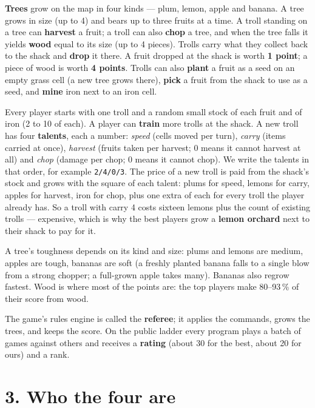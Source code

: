 \documentclass[10pt,a4paper]{article}
\begin{document}
\textbf{Trees} grow on the map in four kinds --- plum, lemon, apple and banana. A tree grows in size (up to 4) and bears up to three fruits at a time. A troll standing on a tree can \textbf{harvest} a fruit; a troll can also \textbf{chop} a tree, and when the tree falls it yields \textbf{wood} equal to its size (up to 4 pieces). Trolls carry what they collect back to the shack and \textbf{drop} it there. A fruit dropped at the shack is worth \textbf{1 point}; a piece of wood is worth \textbf{4 points}. Trolls can also \textbf{plant} a fruit as a seed on an empty grass cell (a new tree grows there), \textbf{pick} a fruit from the shack to use as a seed, and \textbf{mine} iron next to an iron cell.

Every player starts with one troll and a random small stock of each fruit and of iron (2 to 10 of each). A player can \textbf{train} more trolls at the shack. A new troll has four \textbf{talents}, each a number: \emph{speed} (cells moved per turn), \emph{carry} (items carried at once), \emph{harvest} (fruits taken per harvest; 0 means it cannot harvest at all) and \emph{chop} (damage per chop; 0 means it cannot chop). We write the talents in that order, for example \texttt{2/4/0/3}. The price of a new troll is paid from the shack's stock and grows with the square of each talent: plums for speed, lemons for carry, apples for harvest, iron for chop, plus one extra of each for every troll the player already has. So a troll with carry 4 costs sixteen lemons plus the count of existing trolls --- expensive, which is why the best players grow a \textbf{lemon orchard} next to their shack to pay for it.

A tree's toughness depends on its kind and size: plums and lemons are medium, apples are tough, bananas are soft (a freshly planted banana falls to a single blow from a strong chopper; a full-grown apple takes many). Bananas also regrow fastest. Wood is where most of the points are: the top players make 80--93\,\% of their score from wood.

The game's rules engine is called the \textbf{referee}; it applies the commands, grows the trees, and keeps the score. On the public ladder every program plays a batch of games against others and receives a \textbf{rating} (about 30 for the best, about 20 for ours) and a rank.

\section*{3. Who the four are}
\end{document}
